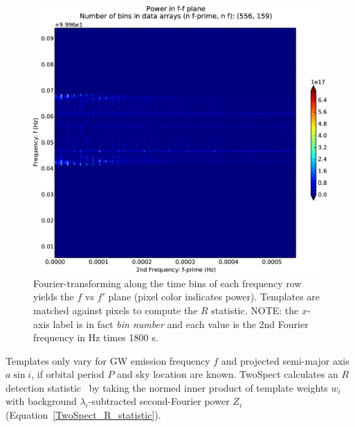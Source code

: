 \documentclass[12pt]{iopart}
\begin{document}
\begin{figure}
\begin{center}
\includegraphics[keepaspectratio,height=0.35\paperheight]{plots/ffplane-4e21-on-4e24.eps}
\caption{Fourier-transforming along the time bins of each frequency row yields the $f$ vs $f'$ plane (pixel color indicates power). Templates are matched against pixels to compute the $R$ statistic. NOTE: the $x$-axis label is in fact \textit{bin number} and each value is the 2nd Fourier frequency in Hz times 1800 s.}
\label{ffplane-figure}
\end{center}
\end{figure}

 
Templates only vary for GW emission frequency $f$ and projected semi-major axis $a \sin i$, if orbital period $P$ and sky location are known.
TwoSpect calculates an $R$ detection statistic~\cite{GoetzTwoSpectMethods2011} by taking the normed inner product of template weights $w_i$ with background $\lambda_i$-subtracted second-Fourier power $Z_i$ (Equation~\ref{TwoSpect_R_statistic}).
\end{document}
